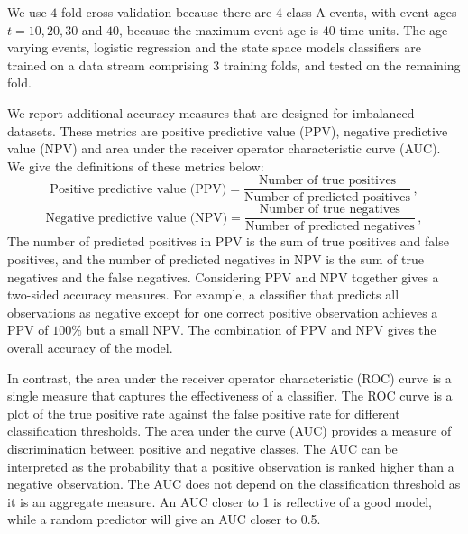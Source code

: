 \documentclass[a4paper,11pt]{article}
\begin{document}
We use $4$-fold cross validation because there are 4 class A events, with event ages $t = 10, 20, 30$ and $40$, because the maximum event-age is $40$ time units. The age-varying events, logistic regression and the state space models classifiers are trained on a data stream comprising 3 training folds, and tested on the remaining fold.

We report additional accuracy measures that are designed for imbalanced datasets. These metrics are positive predictive value (PPV), negative predictive value (NPV) and area under the receiver operator characteristic curve (AUC). We give the definitions of these metrics below:
$$
  \text{Positive predictive value (PPV)} = \frac{ \text{Number of true positives} }{ \text{Number of predicted positives} } \, ,
$$
$$
  \text{Negative predictive value (NPV)} = \frac{ \text{Number of true negatives} }{ \text{Number of predicted negatives} } \, ,
$$
The number of predicted positives in PPV is the sum of true positives and false positives, and the number of predicted negatives in NPV is the sum of true negatives and the false negatives. Considering PPV and NPV together gives a two-sided accuracy measures. For example, a classifier that predicts all observations as negative except for one correct positive observation achieves a PPV of $100\%$ but a small NPV\@. The combination of PPV and NPV gives the overall accuracy of the model.

In contrast, the area under the receiver operator characteristic (ROC) curve is a single measure that captures the effectiveness of a classifier. The ROC curve is a plot of the true positive rate against the false positive rate for different classification thresholds. The area under the curve (AUC) provides a measure of discrimination between positive and negative classes. The AUC can be interpreted as the probability that a positive observation is ranked higher than a negative observation. The AUC does not depend on the classification threshold as it is an aggregate measure. An AUC closer to 1 is reflective of a good model, while a random predictor will give an AUC closer to 0.5.



\end{document}
